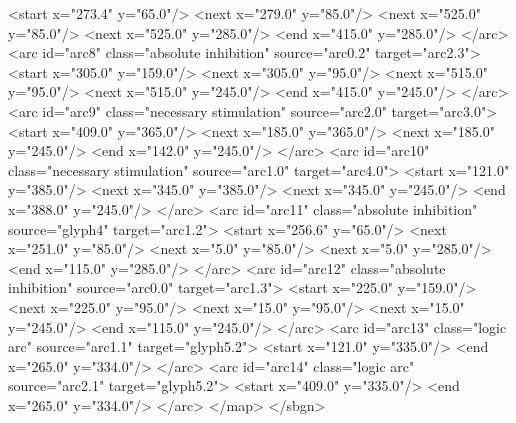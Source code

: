 \begin{example}
            <start x="273.4" y="65.0"/>
            <next x="279.0" y="85.0"/>
            <next x="525.0" y="85.0"/>
            <next x="525.0" y="285.0"/>
            <end x="415.0" y="285.0"/>
        </arc>
        <arc id="arc8" class="absolute inhibition" source="arc0.2" target="arc2.3">
            <start x="305.0" y="159.0"/>
            <next x="305.0" y="95.0"/>
            <next x="515.0" y="95.0"/>
            <next x="515.0" y="245.0"/>
            <end x="415.0" y="245.0"/>
        </arc>
        <arc id="arc9" class="necessary stimulation" source="arc2.0" target="arc3.0">
            <start x="409.0" y="365.0"/>
            <next x="185.0" y="365.0"/>
            <next x="185.0" y="245.0"/>
            <end x="142.0" y="245.0"/>
        </arc>
        <arc id="arc10" class="necessary stimulation" source="arc1.0" target="arc4.0">
            <start x="121.0" y="385.0"/>
            <next x="345.0" y="385.0"/>
            <next x="345.0" y="245.0"/>
            <end x="388.0" y="245.0"/>
        </arc>
        <arc id="arc11" class="absolute inhibition" source="glyph4" target="arc1.2">
            <start x="256.6" y="65.0"/>
            <next x="251.0" y="85.0"/>
            <next x="5.0" y="85.0"/>
            <next x="5.0" y="285.0"/>
            <end x="115.0" y="285.0"/>
        </arc>
        <arc id="arc12" class="absolute inhibition" source="arc0.0" target="arc1.3">
            <start x="225.0" y="159.0"/>
            <next x="225.0" y="95.0"/>
            <next x="15.0" y="95.0"/>
            <next x="15.0" y="245.0"/>
            <end x="115.0" y="245.0"/>
        </arc>
        <arc id="arc13" class="logic arc" source="arc1.1" target="glyph5.2">
            <start x="121.0" y="335.0"/>
            <end x="265.0" y="334.0"/>
        </arc>
        <arc id="arc14" class="logic arc" source="arc2.1" target="glyph5.2">
            <start x="409.0" y="335.0"/>
            <end x="265.0" y="334.0"/>
        </arc>
    </map>
</sbgn>
\end{example}


